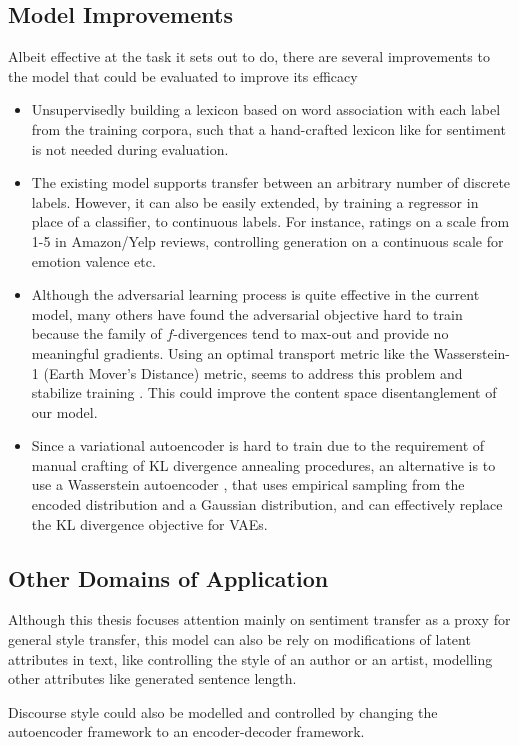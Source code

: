 \subsection{Model Improvements}

Albeit effective at the task it sets out to do, there are several improvements to the model that could be evaluated to improve its efficacy
\begin{itemize}
	\item Unsupervisedly building a lexicon based on word association with each label from the training corpora, such that a hand-crafted lexicon like \cite{hu2004mining} for sentiment is not needed during evaluation.
	\item The existing model supports transfer between an arbitrary number of discrete labels. However, it can also be easily extended, by training a regressor in place of a classifier, to continuous labels. For instance, ratings on a scale from 1-5 in Amazon/Yelp reviews, controlling generation on a continuous scale for emotion valence etc.
	\item Although the adversarial learning process is quite effective in the current model, many others have found the adversarial objective hard to train because the family of $f$-divergences tend to max-out and provide no meaningful gradients. Using an optimal transport metric like the Wasserstein-1 (Earth Mover's Distance) metric, seems to address this problem and stabilize training \citep{arjovsky2017wasserstein, gulrajani2017improved}. This could improve the content space disentanglement of our model.
	\item Since a variational autoencoder is hard to train due to the requirement of manual crafting of KL divergence annealing procedures, an alternative is to use a Wasserstein autoencoder \citep{tolstikhin2017wasserstein}, that uses empirical sampling from the encoded distribution and a Gaussian distribution, and can effectively replace the KL divergence objective for VAEs.
\end{itemize}


\subsection{Other Domains of Application}

Although this thesis focuses attention mainly on sentiment transfer as a proxy for general style transfer, this model can also be  rely on modifications of latent attributes in text, like controlling the style of an author or an artist, modelling other attributes like generated sentence length.

Discourse style could also be modelled and controlled by changing the autoencoder framework to an encoder-decoder framework.
